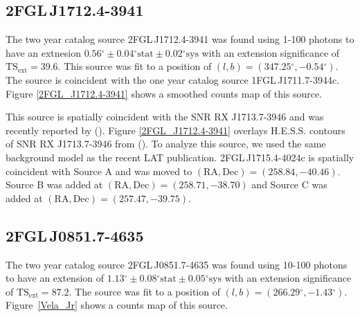 \documentclass[12pt,preprint]{aastex}
\newcommand{\gev}{\text{GeV}\xspace}
\newcommand{\tev}{\text{TeV}\xspace}
\newcommand{\tsext}{{\ensuremath{\text{TS}_{\text{ext}}}}\xspace}
\newcommand{\sys}{\text{sys}\xspace}
\newcommand{\stat}{\text{stat}\xspace}
\renewcommand{\deg}{\ensuremath{^\circ}\xspace}
\begin{document}
\subsection{2FGL\,J1712.4-3941}
\label{section_2FGL_J1712.4-3941}


The two year catalog source 2FGL\,J1712.4-3941 was found using 1-100 \gev
photons to have an extnesion $0.56\deg\pm0.04\deg\stat\pm0.02\deg\sys$
with an extension significance of $\tsext=39.6$.  This source was
fit to a position of $(l,b)=(347.25\deg,-0.54\deg)$.  The source
is coincident with the one year catalog source 1FGL\,J1711.7-3944c.
Figure \ref{2FGL_J1712.4-3941} shows a smoothed counts map of this source.

This source is spatially coincident with the SNR RX J1713.7-3946
and was recently reported by (\cite{rx_j1713_lat}).  Figure
\ref{2FGL_J1712.4-3941} overlays H.E.S.S. \tev contours of SNR RX
J1713.7-3946 from (\cite{rx_j1713_hess}).  To analyze this source,
we used the same background model as the recent LAT publication.
2FGL\,J1715.4-4024c is spatially coincident with Source A and was
moved to $(\text{RA},\text{Dec})=(258.84,-40.46)$. Source B was added
at $(\text{RA},\text{Dec})=(258.71,-38.70)$ and Source C was added at
$(\text{RA},\text{Dec})=(257.47,-39.75)$.

\subsection{2FGL\,J0851.7-4635}
\label{section_2FGL_J0851.7-4635}


The two year catalog source 2FGL\,J0851.7-4635 was found 
using 10-100 \gev photons to have an
extension of $1.13\deg\pm0.08\deg\stat\pm0.05\deg\sys$ 
with an extension
significance of $\tsext=87.2$.  The source was fit to a position of
$(l,b)=(266.29\deg,-1.43\deg)$.  Figure~\ref{Vela_Jr} shows a counts
map of this source.
\end{document}
